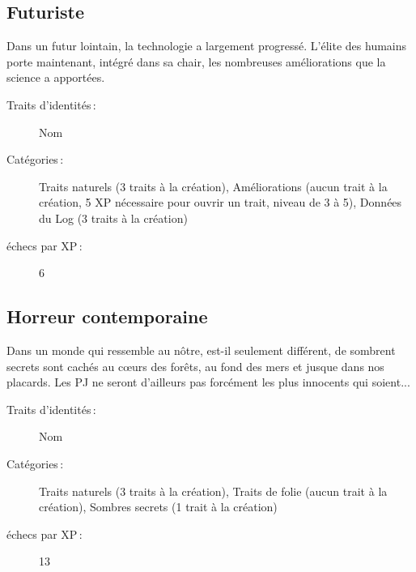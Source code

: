 \documentclass[a4paper,10pt,twoside,twocolumn]{article}
\begin{document}
 \subsection{Futuriste}
 
 Dans un futur lointain, la technologie a largement progressé. L'élite des humains porte maintenant, intégré dans sa chair, les nombreuses améliorations que la science a apportées.
 
 \begin{description}
  \item [Traits d'identités\,:] Nom
  \item [Catégories\,:] Traits naturels (3 traits à la création), Améliorations (aucun trait à la création, 5 XP nécessaire pour ouvrir un trait, niveau de 3 à 5), Données du Log (3 traits à la création)
  \item [échecs par XP\,:] 6
 \end{description}
 
 \subsection{Horreur contemporaine}
 
 Dans un monde qui ressemble au nôtre, est-il seulement différent, de sombrent secrets sont cachés au cœurs des forêts, au fond des mers et jusque dans nos placards. Les PJ ne seront d'ailleurs pas forcément les plus innocents qui soient...
 
 \begin{description}
  \item [Traits d'identités\,:] Nom
  \item [Catégories\,:] Traits naturels (3 traits à la création), Traits de folie (aucun trait à la création), Sombres secrets (1 trait à la création)
  \item [échecs par XP\,:] 13
 \end{description}
 
\end{document}
